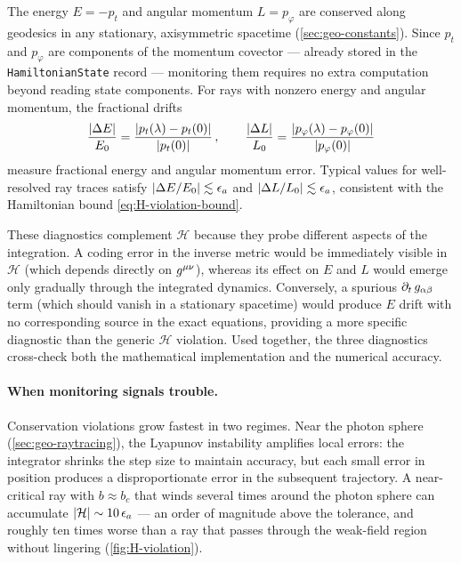 The energy $E = -p_t$ and angular momentum $L = p_\varphi$ are conserved
along geodesics in any stationary, axisymmetric spacetime
(\cref{sec:geo-constants}).  Since $p_t$ and $p_\varphi$ are components
of the momentum covector --- already stored in the
\texttt{HamiltonianState} record --- monitoring them requires no extra
computation beyond reading state components.  For rays with nonzero
energy and angular momentum, the fractional drifts
%
\begin{equation}
  \frac{\left\lvert \Delta E \right\rvert}{E_0}
  = \frac{\left\lvert p_t(\lambda) - p_t(0) \right\rvert}{\left\lvert p_t(0) \right\rvert} \,, \qquad
  \frac{\left\lvert \Delta L \right\rvert}{L_0}
  = \frac{\left\lvert p_\varphi(\lambda) - p_\varphi(0) \right\rvert}{\left\lvert p_\varphi(0) \right\rvert}
  \label{eq:EL-drift}
\end{equation}
%
measure fractional energy and angular momentum error.  Typical values
for well-resolved ray traces satisfy
$\left\lvert \Delta E/E_0 \right\rvert \lesssim \epsilon_a$ and
$\left\lvert \Delta L/L_0 \right\rvert \lesssim \epsilon_a$, consistent with the
Hamiltonian bound \cref{eq:H-violation-bound}.

These diagnostics complement $\mathcal{H}$ because they probe
different aspects of the integration.  A coding error in the inverse
metric would be immediately visible in $\mathcal{H}$ (which depends
directly on $g^{\mu\nu}$), whereas its effect on $E$ and $L$ would
emerge only gradually through the integrated dynamics.  Conversely, a
spurious $\partial_{t}\,g_{\alpha\beta}$ term (which should vanish in a
stationary spacetime) would produce $E$ drift with no corresponding
source in the exact equations, providing a more specific diagnostic
than the generic $\mathcal{H}$ violation.  Used together, the three
diagnostics cross-check both the mathematical implementation and the
numerical accuracy.

\paragraph{When monitoring signals trouble.}

Conservation violations grow fastest in two regimes.  Near the photon
sphere (\cref{sec:geo-raytracing}), the Lyapunov instability amplifies
local errors: the integrator shrinks the step size to maintain accuracy,
but each small error in position produces a disproportionate error in
the subsequent trajectory.  A near-critical ray with $b \approx b_c$
that winds several times around the photon sphere can accumulate
$\left\lvert \mathcal{H} \right\rvert \sim 10\,\epsilon_a$ --- an order of magnitude above
the tolerance, and roughly ten times worse than a ray that passes
through the weak-field region without lingering
(\cref{fig:H-violation}).

